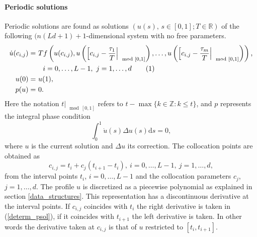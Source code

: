\documentclass[10pt]{scrartcl}
\renewcommand{\d}{\mathrm{d}}
\newcommand{\RR}{\mathbb{R}}
\newcommand{\ZZ}{\mathbb{Z}}
\newcommand\numberthis{\addtocounter{equation}{1}\tag{\theequation}}
\begin{document}
{\paragraph{Periodic solutions}
Periodic solutions are found as solutions $(u(s),\,s\in[0,1];T\in\RR)$
of the following $(n(Ld+1)+1$-dimensional system with no free
parameters.
\begin{align*}\label{determ_psol}
\dot{u}(c_{i,j})=&\
Tf\left(u(c_{i,j}),u\left(\left[c_{i,j}-\frac{\tau_1}{T}\right\vert_{\mod[0,1]}\right),\ldots,
u\left(\left[c_{i,j}-\frac{\tau_m}{T}\right\vert_{\mod[0,1]}\right)\right)\mbox{,}\\
&\quad i=0,\ldots,L-1,\ j=1,\ldots,d \numberthis\\
u(0)=&\ u(1), \\
p(u)=&\ 0.
\end{align*}
Here the notation $t\vert_{\mod[0,1]}$ refers to
$t-\max\{k\in\ZZ:k\leq t\}$, and $p$ represents the integral phase
condition
\begin{equation}\label{integral_phase_cond}
\int_0^1\dot{u}(s)\Delta u(s)\d s=0,
\end{equation}
where $u$ is the current solution and $\Delta u$ its correction.
The collocation points are obtained as 
\[
c_{i,j}=t_i+c_j(t_{i+1}-t_i),\ i=0,\ldots,L-1,\ j=1,\ldots,d,
\]
from the interval points $t_i$, $i=0,\ldots,L-1$ and the collocation
parameters $c_j$, $j=1,\ldots,d$.  The profile $u$ is discretized as a
piecewise polynomial as explained in section \ref{data_structures}.
This representation has a discontinuous derivative at the interval
points. If $c_{i,j}$ coincides with $t_i$ the right derivative is
taken in (\ref{determ_psol}), if it coincides with $t_{i+1}$ the left
derivative is taken. In other words the derivative taken at $c_{i,j}$
is that of $u$ restricted to $[t_i,t_{i+1}]$.

}
\end{document}
